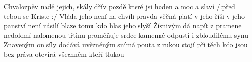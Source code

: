 \begin{TEXT}{Chvalozpěv}
\SLOKA {}  nadě \NL
{} jejich,  skály    \NL
{} dřív  pozdě \NL
{}  které   
\REFREN  {} jsi hoden  a   \NL
{} moc a  slaví  \NL
/:před tebou se  Kriste   \NL
{}   :/
\SLOKA Vláda jeho není na chvíli \NL
pravda věčná platí v jeho říši \NL
v jeho panství není násilí \NL
blaze tomu kdo hlas jeho slyší 
\SLOKA Žíznivým dá napít z pramene \NL
nedolomí nalomenou třtinu \NL
proměňuje srdce kamenné \NL
odpustí i zbloudilému synu 
\SLOKA Znaveným on síly dodává \NL
uvězněným snímá pouta z rukou \NL
stojí při těch kdo jsou bez práva \NL
otevírá všechněm kteří tlukou \NL
\end{TEXT}
